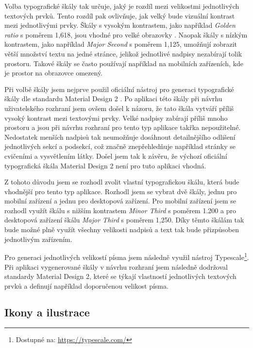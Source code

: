 Volba typografické škály tak určuje, jaký je rozdíl mezi velikostmi jednotlivých textových prvků. Tento rozdíl pak ovlivňuje, jak velký bude vizuální kontrast mezi jednotlivými prvky. Škály s vysokým kontrastem, jako například \textit{Golden ratio} s poměrem 1,618, jsou vhodné pro velké obrazovky \cite{TypographicScales}. Naopak škály s nízkým kontrastem, jako například \textit{Major Second} s poměrem 1,125, umožňují zobrazit větší množství textu na jedné stránce, jelikož jednotlivé nadpisy nezabírají tolik prostoru. Takové škály se často používají například na mobilních zařízeních, kde je prostor na obrazovce omezený.

Při volbě škály jsem nejprve použil oficiální nástroj pro generaci typografické škály dle standardu Material Design 2 \cite{MaterialDesign2TypeSystem}. Po aplikaci této škály při návrhu uživatelského rozhraní jsem ovšem došel k názoru, že tato škála vytváří příliš vysoký kontrast mezi textovými prvky. Velké nadpisy zabírají příliš mnoho prostoru a jsou při návrhu rozhraní pro tento typ aplikace takřka nepoužitelné. Nedostatek menších nadpisů tak neumožňuje dosáhnout detailnějšího odlišení jednotlivých sekcí a podsekcí, což značně znepřehledňuje například stránky se cvičeními a vysvětlením látky. Došel jsem tak k závěru, že výchozí oficiální typografická škála Material Design 2 není pro tuto aplikaci vhodná.

Z tohoto důvodu jsem se rozhodl zvolit vlastní typografickou škálu, která bude vhodnější pro tento typ aplikace. Rozhodl jsem se vybrat dvě škály, jednu pro mobilní zařízení a jednu pro desktopová zařízení. Pro mobilní zařízení jsem se rozhodl využít škálu s nižším kontrastem \textit{Minor Third} s poměrem 1.200 a pro desktopová zařízení škálu \textit{Major Third} s poměrem 1,250. Díky těmto škálám tak bude možné plně využít všechny velikosti nadpisů a text tak bude přizpůsoben jednotlivým zařízením. \cite{TypographicScales}

Pro generaci jednotlivých velikostí písma jsem následně využil nástroj Typescale\footnote{Dostupné na: \href{https://typescale.com/}{https://typescale.com/}}. Při aplikaci vygenerované škály v návrhu rozhraní jsem následně dodržoval standardy Material Design 2, které se týkají vlastností jednotlivých textových prvků a definují například doporučenou velikost písma.

\subsection{Ikony a ilustrace}

